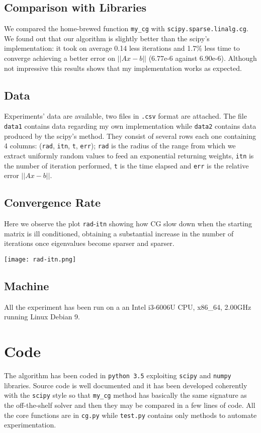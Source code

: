 \documentclass[12pt]{article}
\newcommand{\1}{\mathbbm{1}}
\begin{document}
\subsection{Comparison with Libraries}
We compared the home-brewed function \texttt{my\_cg} with \texttt{scipy.sparse.linalg.cg}. We found out that our algorithm is slightly better than the scipy's implementation: it took on average 0.14 less iterations and 1.7\% less time to converge achieving a better error on $||Ax - b||$ (6.77e-6 against 6.90e-6). Although not impressive this results shows that my implementation works as expected.

\subsection{Data}
Experiments' data are available, two files in \texttt{.csv} format are attached. The file \texttt{data1} contains data regarding my own implementation while \texttt{data2} contains data produced by the scipy's method. They consist of several rows each one containing 4 columns: (\texttt{rad}, \texttt{itn}, \texttt{t}, \texttt{err}); \texttt{rad} is the radius of the range from which we extract uniformly random values to feed an exponential returning weights, \texttt{itn} is the number of iteration performed, \texttt{t} is the time elapsed and \texttt{err} is the relative error $||Ax - b||$.


\subsection{Convergence Rate}
Here we observe the plot \texttt{rad}-\texttt{itn} showing how CG slow down when the starting matrix is ill conditioned, obtaining a substantial increase in the number of iterations once eigenvalues become sparser and sparser. 

\begin{center}
\texttt{[image: rad-itn.png]}
\end{center}

\subsection{Machine}
All the experiment has been run on a an Intel i3-6006U CPU, x86\_64, 2.00GHz running Linux Debian 9.

\section{Code}
The algorithm has been coded in \texttt{python 3.5} exploiting \texttt{scipy} and \texttt{numpy} libraries. Source code is well documented and it has been developed coherently with the \texttt{scipy} style so that \texttt{my\_cg} method has basically the same signature as the off-the-shelf solver and then they may be compared in a few lines of code. All the core functions are in \texttt{cg.py} while \texttt{test.py} contains only methods to automate experimentation.
  
  

\end{document}
